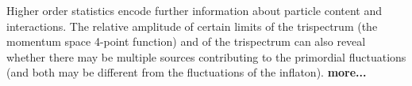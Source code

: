 Higher order statistics encode further information about particle content and interactions. The relative amplitude of certain limits of the trispectrum (the momentum space 4-point function) and of the trispectrum can also reveal whether there may be multiple sources contributing to the primordial fluctuations (and both may be different from the fluctuations of the inflaton). {\bf more...}






